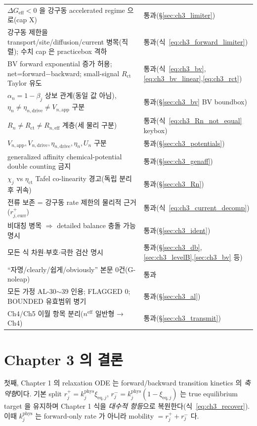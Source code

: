 \documentclass[11pt,a4paper]{article}
\newcommand{\eff}{\mathrm{eff}}
\newcommand{\eq}{\mathrm{eq}}
\newcommand{\app}{\mathrm{app}}
\newcommand{\drive}{\mathrm{drive}}
\newcommand{\ct}{\mathrm{ct}}
\newcommand{\curr}{\mathrm{curr}}
\begin{document}
{\begin{longtable}{>{\raggedright\arraybackslash}p{} >{\raggedright\arraybackslash}p{}}
$\Delta G_{\eff}<0$ 을 강구동 accelerated regime 으로(cap X) & 통과(\S\ref{sec:ch3_limiter}) \\
강구동 제한을 transport/site/diffusion/current 병목(직렬); 수치 cap 은 practicebox 격하 & 통과(식~\eqref{eq:ch3_forward_limiter}) \\
BV forward exponential 증가 허용; net=forward$-$backward; small-signal $R_\ct$ Taylor 유도 & 통과(식~\eqref{eq:ch3_bv},\allowbreak\eqref{eq:ch3_bv_linear},\allowbreak\eqref{eq:ch3_rct}) \\
$\alpha_n=1-\beta_j$ 상보 관계(동일 값 아님), $\eta_n\ne\eta_{n,\drive}\ne V_{n,\app}$ 구분 & 통과(\S\ref{sec:ch3_bv} BV boundbox) \\
$R_n\ne R_\ct\ne R_{n,\eff}$ 계층(세 물리 구분) & 통과(식~\eqref{eq:ch3_Rn_not_equal} keybox) \\
$V_{n,\app},V_{n,\drive},\eta_{n,\drive},\eta_n,U_n$ 구분 & 통과(\S\ref{sec:ch3_potentials}) \\
generalized affinity chemical-potential double counting 금지 & 통과(\S\ref{sec:ch3_genaff}) \\
$\chi_j$ vs $\eta_\ct$ Tafel co-linearity 경고(독립 분리 후 귀속) & 통과(\S\ref{sec:ch3_Rn}) \\
전류 보존 = 강구동 rate 제한의 물리적 근거($r_{j,\curr}^+$) & 통과(식~\eqref{eq:ch3_current_decomp}) \\
비대칭 병목 $\Rightarrow$ detailed balance 충돌 가능 명시 & 통과(\S\ref{sec:ch3_ident}) \\
모든 식 차원$\cdot$부호$\cdot$극한 검산 명시 & 통과(\S\ref{sec:ch3_db},\ref{sec:ch3_levelB},\ref{sec:ch3_bv} 등) \\
``자명/clearly/쉽게/obviously'' 본문 0건(G-noleap) & 통과 \\
모든 가정 AL-30$\sim$39 인용; FLAGGED 0; BOUNDED 유효범위 병기 & 통과(\S\ref{sec:ch3_al}) \\
Ch4/Ch5 이월 항목 분리($n^\eff$ 일반형 → Ch4) & 통과(\S\ref{sec:ch3_transmit}) \\
\bottomrule
\end{longtable}
}

\section{Chapter 3 의 결론}\label{sec:ch3_concl}
첫째, Chapter 1 의 relaxation ODE 는 forward/backward transition kinetics 의 \emph{축약형}이다. 기본 split
$r_j^+=k_j^{\mathrm{phys}}\xi_{\eq,j}$, $r_j^-=k_j^{\mathrm{phys}}(1-\xi_{\eq,j})$ 는 true equilibrium target 을
유지하며 Chapter 1 식을 \emph{대수적 항등}으로 복원한다(식~\eqref{eq:ch3_recover}). 이때 $k_j^{\mathrm{phys}}$ 는
forward-only rate 가 아니라 mobility $=r_j^++r_j^-$ 다.
\end{document}

